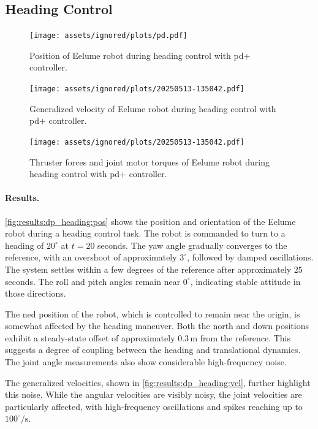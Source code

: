 \subsection{Heading Control}

\begin{figure}[!ht]
    \centering
    \texttt{[image: assets/ignored/plots/pd.pdf]}
    \caption{Position of Eelume robot during heading control with \gls{pd+} controller.}
    \label{fig:results:dp_heading:pos}
\end{figure}
\begin{figure}[!ht]
    \centering
    \texttt{[image: assets/ignored/plots/20250513-135042.pdf]}
    \caption{Generalized velocity of Eelume robot during heading control with \gls{pd+} controller.}
    \label{fig:results:dp_heading:vel}
\end{figure}
\begin{figure}[!ht]
    \centering
    \texttt{[image: assets/ignored/plots/20250513-135042.pdf]}
    \caption{Thruster forces and joint motor torques of Eelume robot during heading control with \gls{pd+} controller.}
    \label{fig:results:dp_heading:forces2}
\end{figure}

\paragraph{Results.}
\autoref{fig:results:dp_heading:pos} shows the position and orientation of the 
Eelume robot during a heading control task. The robot is commanded to turn to 
a heading of \(20^\circ\) at \(t = 20\) seconds. The yaw angle gradually 
converges to the reference, with an overshoot of approximately \(3^\circ\), 
followed by damped oscillations. The system settles within a few degrees of 
the reference after approximately \(25\) seconds. The roll and pitch angles 
remain near \(0^\circ\), indicating stable attitude in those directions.

The \gls{ned} position of the robot, which is controlled to remain near the 
origin, is somewhat affected by the heading maneuver. Both the north and down 
positions exhibit a steady-state offset of approximately \(0.3\,\mathrm{m}\) 
from the reference. This suggests a degree of coupling between the heading and 
translational dynamics. The joint angle measurements also show considerable 
high-frequency noise.

The generalized velocities, shown in \autoref{fig:results:dp_heading:vel}, 
further highlight this noise. While the angular velocities are visibly noisy, 
the joint velocities are particularly affected, with high-frequency 
oscillations and spikes reaching up to \(100^\circ/\mathrm{s}\).

